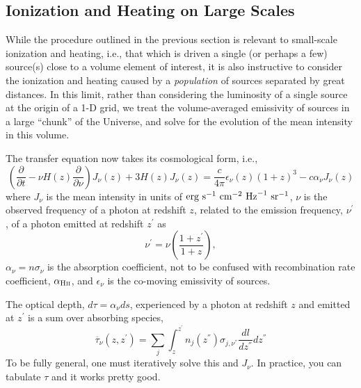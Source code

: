 %



\subsection{Ionization and Heating on Large Scales} \label{sec:largescales}
While the procedure outlined in the previous section is relevant to small-scale ionization and heating, i.e., that which is driven a single (or perhaps a few) source(s) close to a volume element of interest, it is also instructive to consider the ionization and heating caused by a \textit{population} of sources separated by great distances. In this limit, rather than considering the luminosity of a single source at the origin of a 1-D grid, we treat the volume-averaged emissivity of sources in a large ``chunk'' of the Universe, and solve for the evolution of the mean intensity in this volume. 

The transfer equation now takes its cosmological form, i.e., 
\begin{equation}
    \left(\frac{\partial}{\partial t} - \nu H(z) \frac{\partial}{\partial \nu} \right) J_{\nu}(z) + 3 H(z) J_{\nu}(z) =  \frac{c}{4\pi} \epsilon_{\nu}(z) (1 + z)^3 - c \alpha_{\nu} J_{\nu}(z) \label{eq:rte_diffeq}
\end{equation}
where $J_{\nu}$ is the mean intensity in units of $\text{erg} \ \text{s}^{-1} \ \text{cm}^{-2} \ \mathrm{Hz}^{-1} \ \text{sr}^{-1}$, $\nu$ is the observed frequency of a photon at redshift $z$, related to the emission frequency, $\nu^{\prime}$, of a photon emitted at redshift $z^{\prime}$ as
\begin{equation}
    \nu^{\prime} = \nu \left(\frac{1 + z^{\prime}}{1 + z}\right) , \label{eq:EmissionFrequency}
\end{equation}
$\alpha_{\nu} = n \sigma_{\nu}$ is the absorption coefficient, not to be confused with recombination rate coefficient, $\alpha_{\text{H} {\textsc{ii}}}$, and $\epsilon_{\nu}$ is the co-moving emissivity of sources.

The optical depth, $d\tau = \alpha_{\nu} ds$, experienced by a photon at redshift $z$ and emitted at $z^{\prime}$ is a sum over absorbing species,
\begin{equation}
    \overline{\tau}_{\nu}(z, z^{\prime}) = \sum_j \int_{z}^{z^{\prime}} n_j(z^{\dprime}) \sigma_{j, \nu^{\dprime}} \frac{dl}{dz^{\dprime}}dz^{\dprime} \label{eq:tau_igm}
\end{equation}
To be fully general, one must iteratively solve this and $J_{\nu}$. In practice, you can tabulate $\tau$ and it works pretty good.

